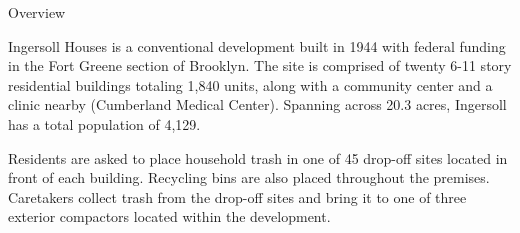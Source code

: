 Overview

Ingersoll Houses is a conventional development built in 1944 with federal funding in the Fort Greene section of Brooklyn. The site is comprised of twenty 6-11 story residential buildings totaling 1,840 units, along with a community center and a clinic nearby (Cumberland Medical Center). Spanning across 20.3 acres, Ingersoll has a total population of 4,129. 

Residents are asked to place household trash in one of 45 drop-off sites located in front of each building. Recycling bins are also placed throughout the premises. Caretakers collect trash from the drop-off sites and bring it to one of three exterior compactors located within the development. 